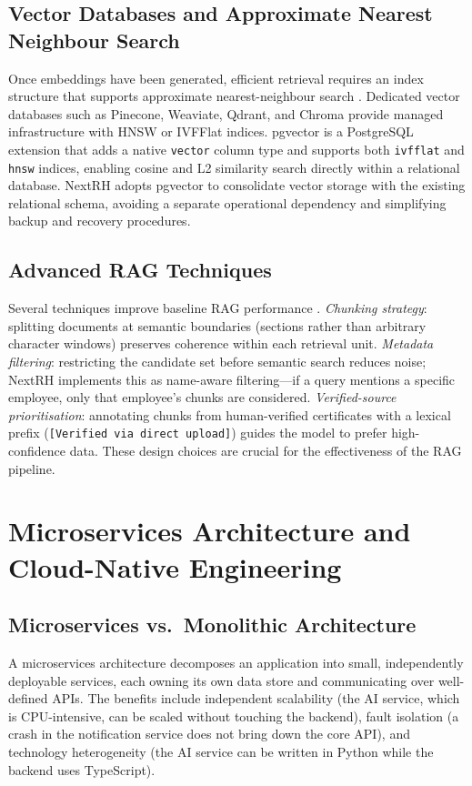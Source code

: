 \documentclass[12pt,a4paper,oneside,openany]{report}
\begin{document}
\subsection{Vector Databases and Approximate Nearest Neighbour Search}
Once embeddings have been generated, efficient retrieval requires an index structure that supports approximate nearest-neighbour search \cite{johnson2019billion}. Dedicated vector databases such as Pinecone, Weaviate, Qdrant, and Chroma provide managed infrastructure with HNSW or IVFFlat indices. pgvector \cite{pgvector2023} is a PostgreSQL extension that adds a native \texttt{vector} column type and supports both \texttt{ivfflat} and \texttt{hnsw} indices, enabling cosine and L2 similarity search directly within a relational database. NextRH adopts pgvector to consolidate vector storage with the existing relational schema, avoiding a separate operational dependency and simplifying backup and recovery procedures.

\subsection{Advanced RAG Techniques}
Several techniques improve baseline RAG performance \cite{gao2023retrieval}. \textit{Chunking strategy}: splitting documents at semantic boundaries (sections rather than arbitrary character windows) preserves coherence within each retrieval unit. \textit{Metadata filtering}: restricting the candidate set before semantic search reduces noise; NextRH implements this as name-aware filtering---if a query mentions a specific employee, only that employee's chunks are considered. \textit{Verified-source prioritisation}: annotating chunks from human-verified certificates with a lexical prefix (\texttt{[Verified via direct upload]}) guides the model to prefer high-confidence data. These design choices are crucial for the effectiveness of the RAG pipeline.

\section{Microservices Architecture and Cloud-Native Engineering}

\subsection{Microservices vs.\ Monolithic Architecture}
A microservices architecture \cite{newman2021microservices} decomposes an application into small, independently deployable services, each owning its own data store and communicating over well-defined APIs. The benefits include independent scalability (the AI service, which is CPU-intensive, can be scaled without touching the backend), fault isolation (a crash in the notification service does not bring down the core API), and technology heterogeneity (the AI service can be written in Python while the backend uses TypeScript).
\end{document}
